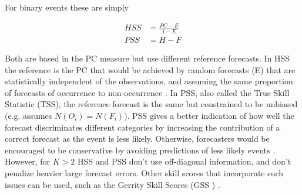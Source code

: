 For binary events these are simply

\begin{align}
HSS & = \frac{PC-E}{1-E} \\
PSS &= H -F 
\end{align}

Both are based in the PC measure but use different reference forecasts. In HSS the reference is the PC that would be achieved by random forecasts (E) that are statistically independent of the observations, and assuming the same proportion of forecasts of occurrence to non-occurrence \citep{Jolliffe2003}. In PSS, also called the True Skill Statistic (TSS), the reference forecast is the same but constrained to be unbiased (e.g. assumes $N(O_i)=N(F_i)$). PSS gives a better indication of how well the forecast discriminates different categories by increasing the contribution of a correct forecast as the event is less likely. Otherwise, forecasters would be encouraged to be conservative by avoiding predictions of less likely events \citep{Wilks2005}. However, for $K>2$ HSS and PSS don't use off-diagonal information, and don't penalize heavier large forecast errors.  Other skill scores that incorporate such issues can be used, such as the Gerrity Skill Scores (GSS ) \citep{Jolliffe2003}.




 

